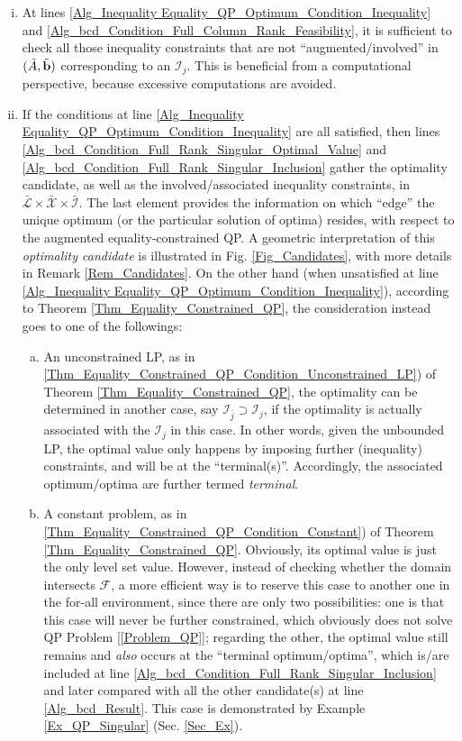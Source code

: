 \documentclass[9pt,twocolumn,twoside,lineno]{pnas-new-1}
\newcommand{\bfb}{{\bf b}}
\newcommand{\calF}{{\mathcal F}}
\newcommand{\calI}{{\mathcal I}}
\newcommand{\calL}{{\mathcal L}}
\newcommand{\calX}{{\mathcal X}}
\theoremstyle{remark}
\begin{document}
\begin{enumerate}[i)]
\item At lines \ref{Alg_Inequality Equality_QP_Optimum_Condition_Inequality} and \ref{Alg_bcd_Condition_Full_Column_Rank_Feasibility}, it is sufficient to check all those inequality constraints that are not ``augmented/involved'' in $(\tilde A,\tilde\bfb)$ corresponding to an $\calI_j$. This is beneficial from a computational perspective, because excessive computations are avoided.
\item If the conditions at line \ref{Alg_Inequality Equality_QP_Optimum_Condition_Inequality} are all satisfied, then lines \ref{Alg_bcd_Condition_Full_Rank_Singular_Optimal_Value} and \ref{Alg_bcd_Condition_Full_Rank_Singular_Inclusion} gather the optimality candidate, as well as the involved/associated inequality constraints, in $\bar\calL\times\bar\calX\times\bar\calI$. The last element provides the information on which ``edge'' the unique optimum (or the particular solution of optima) resides, with respect to the augmented equality-constrained QP. A geometric interpretation of this \textit{optimality candidate} is illustrated in Fig. \ref{Fig_Candidates}, with more details in Remark \ref{Rem_Candidates}. On the other hand (when unsatisfied at line \ref{Alg_Inequality Equality_QP_Optimum_Condition_Inequality}), according to Theorem \ref{Thm_Equality_Constrained_QP}, the consideration instead goes to one of the followings:
    \begin{enumerate}[a)]
    \item\label{App_Proof_QP_bcd_LP} An unconstrained LP, as in \ref{Thm_Equality_Constrained_QP_Condition_Unconstrained_LP}) of Theorem \ref{Thm_Equality_Constrained_QP}, the optimality can be determined in another case, say $\calI_{\bar j}\supset\calI_j$, if the optimality is actually associated with the $\calI_j$ in this case. In other words, given the unbounded LP, the optimal value only happens by imposing further (inequality) constraints, and will be at the ``terminal(s)''. Accordingly, the associated optimum/optima are further termed \textit{terminal}.
    \item\label{App_Proof_QP_bcd_Constant} A constant problem, as in \ref{Thm_Equality_Constrained_QP_Condition_Constant}) of Theorem \ref{Thm_Equality_Constrained_QP}. Obviously, its optimal value is just the only level set value. However, instead of checking whether the domain intersects $\calF$, a more efficient way is to reserve this case to another one in the for-all environment, since there are only two possibilities: one is that this case will never be further constrained, which obviously does not solve QP Problem [\ref{Problem_QP}]; regarding the other, the optimal value still remains and \textit{also} occurs at the ``terminal optimum/optima'', which is/are included at line \ref{Alg_bcd_Condition_Full_Rank_Singular_Inclusion} and later compared with all the other candidate(s) at line \ref{Alg_bcd_Result}. This case is demonstrated by Example \ref{Ex_QP_Singular} (Sec. \ref{Sec_Ex}).

\end{enumerate}
\end{enumerate}
\end{document}
